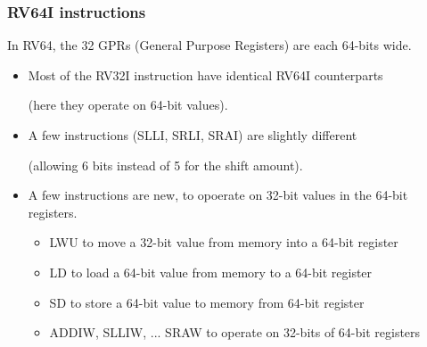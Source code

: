 \begin{frame}
\frametitle{RV64I instructions}

In RV64, the 32 GPRs (General Purpose Registers) are each 64-bits wide.

\vspace{1ex}

\begin{itemize}

\item Most of the RV32I instruction have identical RV64I counterparts

  {\footnotesize (here they operate on 64-bit values).}

\item A few instructions (SLLI, SRLI, SRAI) are slightly different

  {\footnotesize (allowing 6 bits instead of 5 for the shift amount).}

\item A few instructions are new, to opoerate on 32-bit values in the
  64-bit registers.
  {\footnotesize
    \begin{itemize}
    \item LWU to move a 32-bit value from memory into a 64-bit register
    \item LD to load a 64-bit value from memory to a 64-bit register
    \item SD to store a 64-bit value to memory from 64-bit register
    \item ADDIW, SLLIW, ... SRAW to operate on 32-bits of 64-bit registers
    \end{itemize}}

\end{itemize}

\end{frame}






